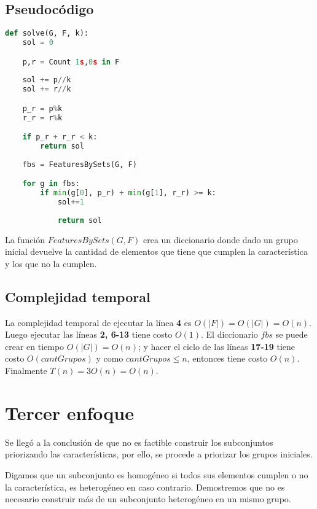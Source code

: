 \documentclass{article}
\begin{document}
\subsection*{Pseudocódigo}

\begin{lstlisting}[language = Python]
def solve(G, F, k):
    sol = 0

    p,r = Count 1s,0s in F
    
    sol += p//k
    sol += r//k

    p_r = p%k
    r_r = r%k

    if p_r + r_r < k:
        return sol
    
    fbs = FeaturesBySets(G, F)

    for g in fbs:
        if min(g[0], p_r) + min(g[1], r_r) >= k:
            sol+=1
    
            return sol

\end{lstlisting}

La función $FeaturesBySets(G, F)$ crea un diccionario donde dado un grupo inicial
devuelve la cantidad de elementos que tiene que cumplen la característica y 
los que no la cumplen.

\subsection*{Complejidad temporal}

La complejidad temporal de ejecutar la línea \textbf{4} es $O(|F|) = O(|G|) = O(n)$.
Luego ejecutar las líneas \textbf{2, 6-13} tiene costo $O(1)$. El diccionario $fbs$ se 
puede crear en tiempo $O(|G|) = O(n)$; y hacer el ciclo de las líneas \textbf{17-19} 
tiene costo $O(cantGrupos)$ y como $cantGrupos \leq n$, entonces tiene costo $O(n)$.
Finalmente $T(n) = 3O(n) = O(n)$.

\section*{Tercer enfoque}

Se llegó a la conclusión de que no es factible construir los subconjuntos priorizando las 
características, por ello, se procede a priorizar los grupos iniciales. 

Digamos que un subconjunto es homogéneo si todos sus elementos cumplen o no la característica, 
es heterogéneo en caso contrario. Demostremos que no es necesario construir 
más de un subconjunto heterogéneo en un mismo grupo.
\end{document}

